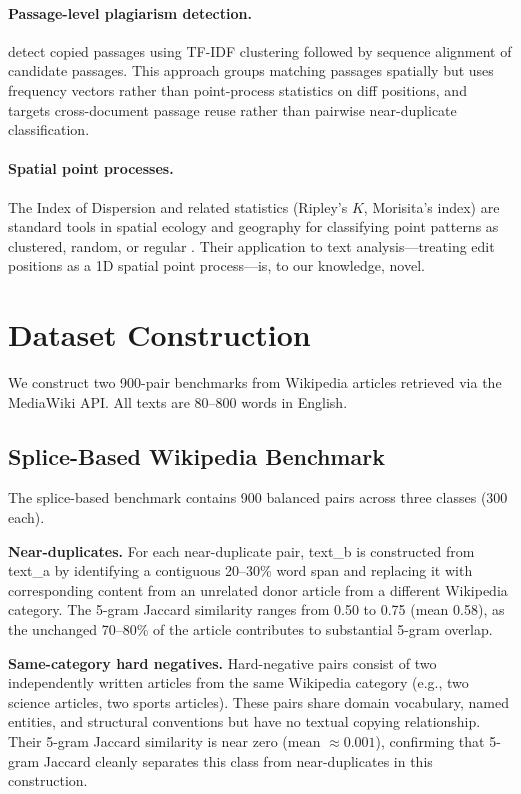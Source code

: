 \documentclass[11pt,letterpaper]{article}
\begin{document}
\paragraph{Passage-level plagiarism detection.}
\citet{Nawab2011} detect copied passages using TF-IDF clustering followed by sequence alignment of candidate passages. This approach groups matching passages spatially but uses frequency vectors rather than point-process statistics on diff positions, and targets cross-document passage reuse rather than pairwise near-duplicate classification.

\paragraph{Spatial point processes.}
The Index of Dispersion and related statistics (Ripley's $K$, Morisita's index) are standard tools in spatial ecology and geography for classifying point patterns as clustered, random, or regular \citep{Cox1966}. Their application to text analysis---treating edit positions as a 1D spatial point process---is, to our knowledge, novel.

\section{Dataset Construction}
\label{sec:data}

We construct two 900-pair benchmarks from Wikipedia articles retrieved via the MediaWiki API. All texts are 80--800 words in English.

\subsection{Splice-Based Wikipedia Benchmark}

The splice-based benchmark contains 900 balanced pairs across three classes (300 each).

\noindent\textbf{Near-duplicates.} For each near-duplicate pair, text\_b is constructed from text\_a by identifying a contiguous 20--30\% word span and replacing it with corresponding content from an unrelated donor article from a different Wikipedia category. The 5-gram Jaccard similarity ranges from 0.50 to 0.75 (mean 0.58), as the unchanged 70--80\% of the article contributes to substantial 5-gram overlap.

\noindent\textbf{Same-category hard negatives.} Hard-negative pairs consist of two independently written articles from the same Wikipedia category (e.g., two science articles, two sports articles). These pairs share domain vocabulary, named entities, and structural conventions but have no textual copying relationship. Their 5-gram Jaccard similarity is near zero (mean $\approx 0.001$), confirming that 5-gram Jaccard cleanly separates this class from near-duplicates in this construction.
\end{document}

